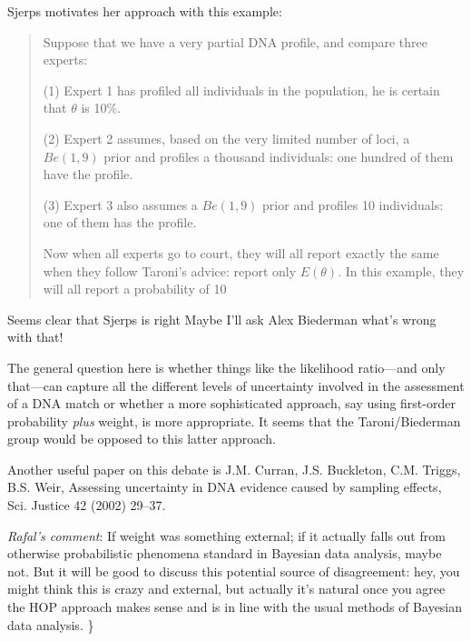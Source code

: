\documentclass[
  10pt,
  dvipsnames,enabledeprecatedfontcommands]{scrartcl}
\begin{document}
Sjerps motivates her approach with this example:

\begin{quote}
Suppose that we have a very partial DNA profile, and compare three experts:

   (1) Expert 1 has profiled all individuals in the population, he is certain that $\theta$ is 10\%.

   (2) Expert 2 assumes, based on the very limited number of loci, a $Be(1,9)$ prior and profiles a
thousand individuals: one hundred of them have the profile.

   (3) Expert 3 also assumes a $Be(1,9)$ prior and profiles 10 individuals: one of them has the profile.

Now when all experts go to court, they will all report exactly the same when they follow Taroni’s
advice: report only $E(\theta)$. In this example, they will all report a probability of 10%
\end{quote}

Seems clear that Sjerps is right Maybe I'll ask Alex Biederman what's
wrong with that!

The general question here is whether things like the likelihood
ratio---and only that---can capture all the different levels of
uncertainty involved in the assessment of a DNA match or whether a more
sophisticated approach, say using first-order probability \textit{plus}
weight, is more appropriate. It seems that the Taroni/Biederman group
would be opposed to this latter approach.

Another useful paper on this debate is J.M. Curran, J.S. Buckleton, C.M.
Triggs, B.S. Weir, Assessing uncertainty in DNA evidence caused by
sampling effects, Sci. Justice 42 (2002) 29--37.


\emph{Rafal's comment}: If weight was something external; if it actually
falls out from otherwise probabilistic phenomena standard in Bayesian
data analysis, maybe not. But it will be good to discuss this potential
source of disagreement: hey, you might think this is crazy and external,
but actually it's natural once you agree the HOP approach makes sense
and is in line with the usual methods of Bayesian data analysis. \}
\end{document}
